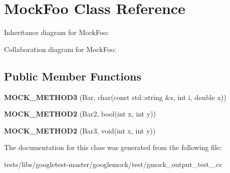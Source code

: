 \hypertarget{classMockFoo}{}\section{Mock\+Foo Class Reference}
\label{classMockFoo}


Inheritance diagram for Mock\+Foo\+:


Collaboration diagram for Mock\+Foo\+:
\subsection*{Public Member Functions}
\begin{DoxyCompactItemize}
\item 
\mbox{\label{classMockFoo_a8f323a65afd93c0605a02b278b101d18}} 
{\bfseries M\+O\+C\+K\+\_\+\+M\+E\+T\+H\+O\+D3} (Bar, char(const std\+::string \&s, int i, double x))
\item 
\mbox{\label{classMockFoo_ae1d53263d5efcf38fda3990302fac6ab}} 
{\bfseries M\+O\+C\+K\+\_\+\+M\+E\+T\+H\+O\+D2} (Bar2, bool(int x, int y))
\item 
\mbox{\label{classMockFoo_af1e0c374cadacdaa7ca69f9c38d85543}} 
{\bfseries M\+O\+C\+K\+\_\+\+M\+E\+T\+H\+O\+D2} (Bar3, void(int x, int y))
\end{DoxyCompactItemize}


The documentation for this class was generated from the following file\+:\begin{DoxyCompactItemize}
\item 
tests/libs/googletest-\/master/googlemock/test/gmock\+\_\+output\+\_\+test\+\_\+.\+cc\end{DoxyCompactItemize}
